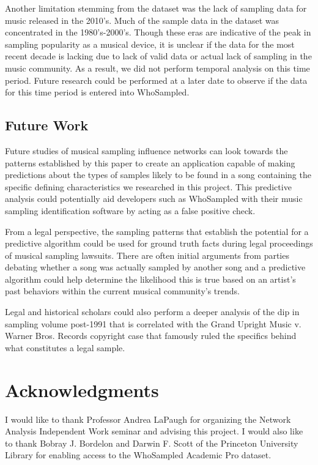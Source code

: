 \documentclass[pageno]{jpaper}
\begin{document}
Another limitation stemming from the dataset was the lack of sampling data for music released in the 2010's. Much of the sample data in the dataset was concentrated in the 1980's-2000's. Though these eras are indicative of the peak in sampling popularity as a musical device, it is unclear if the data for the most recent decade is lacking due to lack of valid data or actual lack of sampling in the music community. As a result, we did not perform temporal analysis on this time period. Future research could be performed at a later date to observe if the data for this time period is entered into WhoSampled.
\subsection{Future Work}
Future studies of musical sampling influence networks can look towards the patterns established by this paper to create an application capable of making predictions about the types of samples likely to be found in a song containing the specific defining characteristics we researched in this project. This predictive analysis could potentially aid developers such as WhoSampled with their music sampling identification software by acting as a false positive check.

From a legal perspective, the sampling patterns that establish the potential for a predictive algorithm could be used for ground truth facts during legal proceedings of musical sampling lawsuits. There are often initial arguments from parties debating whether a song was actually sampled by another song and a predictive algorithm could help determine the likelihood this is true based on an artist's past behaviors within the current musical community's trends.

Legal and historical scholars could also perform a deeper analysis of the dip in sampling volume post-1991 that is correlated with the Grand Upright Music v. Warner Bros. Records copyright case that famously ruled the specifics behind what constitutes a legal sample.
\section{Acknowledgments}
I would like to thank Professor Andrea LaPaugh for organizing the Network Analysis Independent Work seminar and advising this project. I would also like to thank Bobray J. Bordelon and Darwin F. Scott of the Princeton University Library for enabling access to the WhoSampled Academic Pro dataset.
\nocite{*}


\end{document}
